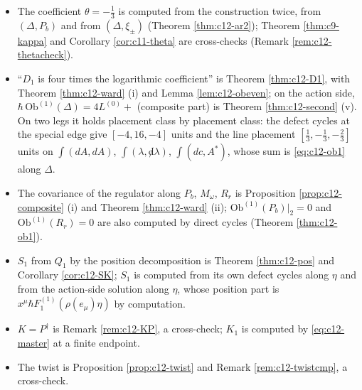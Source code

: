\begin{remark}
\label{rem:c12-shortcuts}
\begin{itemize}
\item The coefficient $\theta=-\tfrac13$ is computed from the construction twice, from $(\Delta,P_b)$ and from $(\Delta,\xi_\pm)$ (Theorem \ref{thm:c12-ar2}); Theorem \ref{thm:c9-kappa} and Corollary \ref{cor:c11-theta} are cross-checks (Remark \ref{rem:c12-thetacheck}).
\item ``$D_1$ is four times the logarithmic coefficient'' is Theorem \ref{thm:c12-D1}, with Theorem \ref{thm:c12-ward} (i) and Lemma \ref{lem:c12-obeven}; on the action side, $\hbar\,\mathrm{Ob}^{(1)}(\Delta)=4L^{(0)}+$ (composite part) is Theorem \ref{thm:c12-second} (v). On two legs it holds placement class by placement class: the defect cycles at the special edge give $[-4,16,-4]$ units and the line placement $[\tfrac13,-\tfrac13,-\tfrac23]$ units on $\int(dA,dA)$, $\int(\lambda,{\not d}\lambda)$, $\int(dc,A^*)$, whose sum is \eqref{eq:c12-ob1} along $\Delta$.
\item The covariance of the regulator along $P_b$, $M_\omega$, $R_r$ is Proposition \ref{prop:c12-composite} (i) and Theorem \ref{thm:c12-ward} (ii); $\mathrm{Ob}^{(1)}(P_b)|_2=0$ and $\mathrm{Ob}^{(1)}(R_r)=0$ are also computed by direct cycles (Theorem \ref{thm:c12-ob1}).
\item $S_1$ from $Q_1$ by the position decomposition is Theorem \ref{thm:c12-pos} and Corollary \ref{cor:c12-SK}; $S_1$ is computed from its own defect cycles along $\eta$ and from the action-side solution along $\eta$, whose position part is $x^\mu\hbar F_1^{(1)}(\rho(e_\mu)\eta)$ by computation.
\item $K=P^\dagger$ is Remark \ref{rem:c12-KP}, a cross-check; $K_1$ is computed by \eqref{eq:c12-master} at a finite endpoint.
\item The twist is Proposition \ref{prop:c12-twist} and Remark \ref{rem:c12-twistcmp}, a cross-check.
\end{itemize}
\end{remark}

